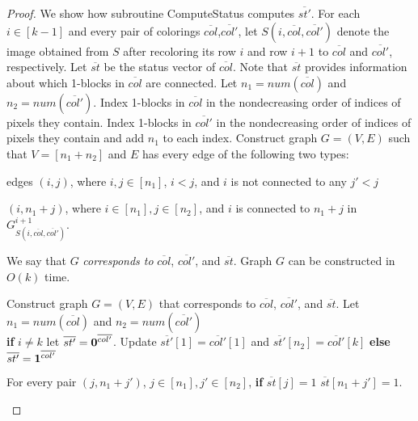 \documentclass[11pt,english]{article}
\renewenvironment{enumerate}[1]{\begin{compactenum}#1}{\end{compactenum}}
\numberwithin{figure}{section}
\newcommand{\Compst}{{\sf ComputeStatus}\xspace}
\begin{document}
\begin{proof}
We show how subroutine \Compst computes $\overline{st'}$. For each $i\in[k-1]$ and every pair of colorings $\overline{col}$,$\overline{col'}$, let $S(i,\overline{col},\overline{col'})$ denote the image obtained from $S$ after recoloring its row $i$ and row $i+1$ to $\overline{col}$ and $\overline{col'}$, respectively. Let $\overline{st}$ be the status vector of $\overline{col}$. Note that $\overline{st}$ provides information about which 1-blocks in $\overline{col}$ are connected. Let $n_1=num(\overline{col})$ and $n_2=num(\overline{col'})$. Index 1-blocks in $\overline{col}$ in the nondecreasing order of indices of pixels they contain. Index 1-blocks in $\overline{col'}$ in the nondecreasing order of indices of pixels they contain and add $n_1$ to each index. Construct graph $G=(V,E)$ such that $V=[n_1+n_2]$ and $E$ has every edge of the following two types:
\begin{enumerate}
\item edges $(i,j)$, where $i,j\in[n_1]$, $i<j$, and $i$ is not connected to any $j'<j$
\item $(i,n_1+j)$, where $i\in[n_1], j\in[n_2]$, and $i$ is connected to $n_1+j$ in $G^{i+1}_{S(i,\overline{col},\overline{col'})}$.
\end{enumerate}

We say that $G$ {\em corresponds to} $\overline{col}$, $\overline{col'}$, and $\overline{st}$. Graph $G$ can be constructed in $O(k)$ time.

\begin{algorithm}\label{alg:conf}
\caption{Subroutine \Compst used in Algorithm~\ref{alg:dist}.}
\label{alg:conf}
\DontPrintSemicolon
\BlankLine


\nl Construct graph $G=(V,E)$ that corresponds to $\overline{col}$, $\overline{col'}$, and $\overline{st}$. Let $n_1=num(\overline{col})$ and $n_2=num(\overline{col'})$\\
\nl \textbf{if} $i\neq k$ let $\overline{st'}=\bold{0}^{\overline{col'}}$. Update $\overline{st'}[1]=\overline{col'}[1]$ and $\overline{st'}[n_2]=\overline{col'}[k]$ \textbf{else} $\overline{st'}=\bold{1}^{\overline{col'}}$

\nl For every pair $(j,n_1+j')$, $j\in[n_1],j'\in[n_2]$, \textbf{if} $\overline{st}[j]=1$  $\overline{st}[n_1+j']=1$.


\end{algorithm}
\end{proof}
\end{document}
